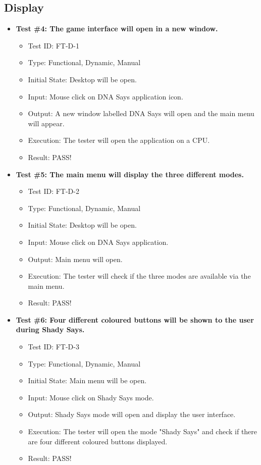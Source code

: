\documentclass[12pt, titlepage]{article}
\begin{document}
\subsection{Display}

\begin{itemize}

\item \textbf{Test \#4: The game interface will open in a new window.}
\begin{itemize}
\item Test ID: FT-D-1
\item Type: Functional, Dynamic, Manual 		
\item Initial State: Desktop will be open. 				
\item Input: Mouse click on DNA Says application icon. 					
\item Output: A new window labelled DNA Says will open and the main menu will appear.  					
\item Execution: The tester will open the application on a CPU.
\item Result: PASS!
\end{itemize}

\item \textbf{Test \#5: The main menu will display the three different modes.}
\begin{itemize}
\item Test ID: FT-D-2
\item Type: Functional, Dynamic, Manual	
\item Initial State: Desktop will be open.					
\item Input: Mouse click on DNA Says application.					
\item Output: Main menu will open. 					
\item Execution: The tester will check if the three modes are available via the main menu.
\item Result: PASS!
\end{itemize}

\item \textbf{Test \#6: Four different coloured buttons will be shown to the user during Shady Says.}
\begin{itemize}
\item Test ID: FT-D-3
\item Type: Functional, Dynamic, Manual		
\item Initial State: Main menu will be open.					
\item Input: Mouse click on Shady Says mode.					
\item Output: Shady Says mode will open and display the user interface.					
\item Execution: The tester will open the mode "Shady Says" and check if there are four different coloured buttons displayed.
\item Result: PASS!
\end{itemize}


\end{itemize}
\end{document}

